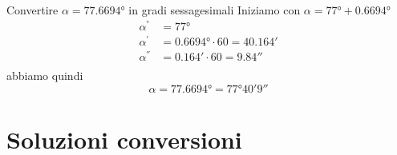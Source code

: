 \begin{exercise}
	Convertire $\alpha=\ang{77.6694}$ in gradi sessagesimali
	\tcblower
	Iniziamo con 
	$\alpha=\ang{77}+\ang{0.6694}$
	\begin{align*}
	\alpha^{\si{\degree}}&=\ang{77}\\ 
	\alpha^{\si{\arcminute}}&=\ang{0.6694}\cdot 60=\ang{;40.164;}\\
	\alpha^{\si{\arcsecond}}&=\ang{;0.164;}\cdot 60=\ang{;;9.84}\\
	\end{align*}
	abbiamo quindi
	\[\alpha=\ang{77.6694}=\ang{77;40;9}\]
\end{exercise}
\tcbstoprecording
\newpage
\section{Soluzioni conversioni}
\tcbinputrecords